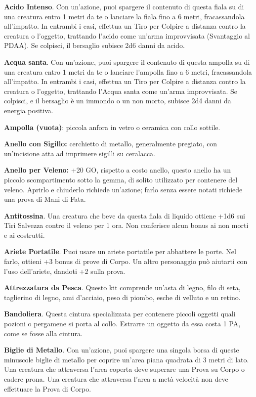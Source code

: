 \documentclass[12pt,a4paper,twoside,openany]{book}
\begin{document}
\begin{multicols}{2}
\textbf{Acido Intenso}. Con un’azione, puoi spargere il contenuto di questa fiala su di una creatura entro 1 metri da te o lanciare la fiala fino a 6 metri, fracassandola all’impatto. In entrambi i casi, effettua un Tiro per Colpire a distanza contro la creatura o l’oggetto, trattando l’acido come un’arma improvvisata (Svantaggio al PDAA). Se colpisci, il bersaglio subisce 2d6 danni da acido.

\textbf{Acqua santa}. Con un’azione, puoi spargere il contenuto di questa ampolla su di una creatura entro 1 metri da te o lanciare l’ampolla fino a 6 metri, fracassandola all’impatto. In entrambi i casi, effettua un Tiro per Colpire a distanza contro la creatura o l’oggetto, trattando l’Acqua santa come un’arma improvvisata. Se colpisci, e il bersaglio è un immondo o un non morto, subisce 2d4 danni da energia positiva.

\textbf{Ampolla (vuota)}: piccola anfora in vetro o ceramica con collo sottile.

\textbf{Anello con Sigillo:} cerchietto di metallo, generalmente pregiato, con un'incisione atta ad imprimere sigilli su ceralacca.

\textbf{Anello per Veleno:} +20 GO, rispetto a costo anello, questo anello ha un piccolo scompartimento sotto la gemma, di solito utilizzato per contenere del veleno. Aprirlo e chiuderlo richiede un'azione; farlo senza essere notati richiede una prova di Mani di Fata.

\textbf{Antitossina}. Una creatura che beve da questa fiala di liquido ottiene +1d6 sui Tiri Salvezza contro il veleno per 1 ora. Non conferisce alcun bonus ai non morti e ai costrutti.

\textbf{Ariete Portatile}. Puoi usare un ariete portatile per abbattere le porte. Nel farlo, ottieni +3 bonus di prove di Corpo. Un altro personaggio può aiutarti con l’uso dell’ariete, dandoti +2 sulla prova.

\textbf{Attrezzatura da Pesca}. Questo kit comprende un’asta di legno, filo di seta, taglierino di legno, ami d’acciaio, peso di piombo, esche di velluto e un retino.

\textbf{Bandoliera}. Questa cintura specializzata per contenere piccoli oggetti quali pozioni o pergamene si porta al collo. Estrarre un oggetto da essa costa 1 PA, come se fosse alla cintura.

\textbf{Biglie di Metallo}. Con un’azione, puoi spargere una singola borsa di queste minuscole biglie di metallo per coprire un’area piana quadrata di 3 metri di lato. Una creatura che attraversa l’area coperta deve superare una Prova su Corpo o cadere prona. Una creatura che attraversa l’area a metà velocità non deve effettuare la Prova di Corpo.


\end{multicols}
\end{document}
